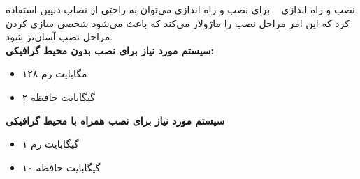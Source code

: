 
\subtitle{قسمت دوم: نصب}
\author{مهدی صفریان \alongside محمدیاسین داوده}

\start

\begin{frame}{نصب و راه اندازی ~\cite{Debian_book}}
  برای نصب و راه اندازی می‌توان به راحتی از نصاب دبیین استفاده کرد که این امر مراحل نصب را ماژولار می‌کند که باعث می‌شود شخصی سازی کردن مراحل نصب آسان‌تر شود.\\
 \textbf{سیستم مورد نیاز برای نصب بدون محیط گرافیکی:}
 \begin{itemize}
   \item ۱۲۸ مگابایت رم
   \item ۲ گیگابایت حافظه
\end{itemize}
\textbf{سیستم مورد نیاز برای نصب همراه با محیط گرافیکی}
\begin{itemize}
  \item ۱ گیگابایت رم
  \item ۱۰ گیگابایت حافظه
\end{itemize}
\end{frame}
